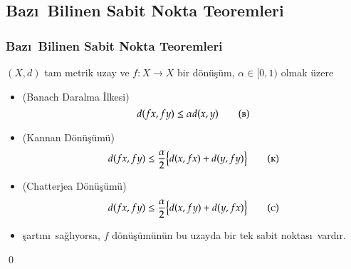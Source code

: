 \documentclass[8pt]{beamer}
\begin{document}
\subsection{Baz\i \ Bilinen Sabit Nokta Teoremleri}
\begin{frame}
\frametitle{Baz\i \ Bilinen Sabit Nokta Teoremleri}
   $(X,d)$  tam metrik uzay ve $f: X \rightarrow X$ bir d\"{o}n\"{u}\c{s}\"{u}m, $\alpha \in [0,1)$ olmak \"{u}zere 
   \begin{itemize}[<+-| alert@+>]

   \item (Banach Daralma \.{I}lkesi\cite{Banach1922})
     \begin{equation} 
       d(fx, fy)\leq \alpha d(x,y)
\tag*{\textsc{(b)}}
        \end{equation}
   \item (Kannan D\"{o}n\"{u}\c{s}\"{u}m\"{u}\cite{Kannan1969})
     \begin{equation} 
       d(fx, fy)\leq \frac{\alpha}{2}\big\{ d(x,fx)+d(y,fy)\big\}
\tag*{\textsc{(k)}}
         \end{equation}
   \item (Chatterjea D\"{o}n\"{u}\c{s}\"{u}m\"{u}\cite{Chatterjea1972})
     \begin{equation} 
       d(fx, fy)\leq \frac{\alpha}{2}\big\{ d(x,fy)+d(y,fx)\big\}
\tag*{\textsc{(c)}}
         \end{equation}
\item[] \c{s}art\i n\i\ sa\u{g}l\i yorsa, $f$ d\"{o}n\"{u}\c{s}\"{u}m\"{u}n\"{u}n bu uzayda bir tek sabit noktas\i\ vard\i r.

   \end{itemize}

    \qed
\end{frame}%
\end{document}
